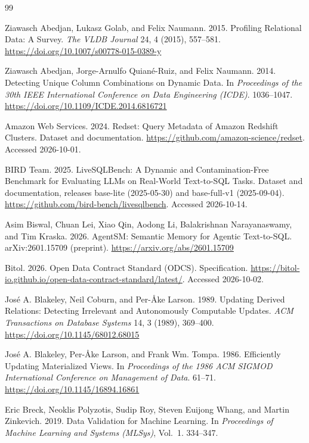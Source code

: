 \begin{thebibliography}{99}

Ziawasch Abedjan, Lukasz Golab, and Felix Naumann. 2015. Profiling Relational Data: A Survey. \emph{The VLDB Journal} 24, 4 (2015), 557--581. \url{https://doi.org/10.1007/s00778-015-0389-y}

Ziawasch Abedjan, Jorge-Arnulfo Quian{\'e}-Ruiz, and Felix Naumann. 2014. Detecting Unique Column Combinations on Dynamic Data. In \emph{Proceedings of the 30th IEEE International Conference on Data Engineering (ICDE)}. 1036--1047. \url{https://doi.org/10.1109/ICDE.2014.6816721}

Amazon Web Services. 2024. Redset: Query Metadata of Amazon Redshift Clusters. Dataset and documentation. \url{https://github.com/amazon-science/redset}. Accessed 2026-10-01.

BIRD Team. 2025. LiveSQLBench: A Dynamic and Contamination-Free Benchmark for Evaluating LLMs on Real-World Text-to-SQL Tasks. Dataset and documentation, releases base-lite (2025-05-30) and base-full-v1 (2025-09-04). \url{https://github.com/bird-bench/livesqlbench}. Accessed 2026-10-14.

Asim Biswal, Chuan Lei, Xiao Qin, Aodong Li, Balakrishnan Narayanaswamy, and Tim Kraska. 2026. AgentSM: Semantic Memory for Agentic Text-to-SQL. arXiv:2601.15709 (preprint). \url{https://arxiv.org/abs/2601.15709}

Bitol. 2026. Open Data Contract Standard (ODCS). Specification. \url{https://bitol-io.github.io/open-data-contract-standard/latest/}. Accessed 2026-10-02.

Jos{\'e} A. Blakeley, Neil Coburn, and Per-{\AA}ke Larson. 1989. Updating Derived Relations: Detecting Irrelevant and Autonomously Computable Updates. \emph{ACM Transactions on Database Systems} 14, 3 (1989), 369--400. \url{https://doi.org/10.1145/68012.68015}

Jos{\'e} A. Blakeley, Per-{\AA}ke Larson, and Frank Wm. Tompa. 1986. Efficiently Updating Materialized Views. In \emph{Proceedings of the 1986 ACM SIGMOD International Conference on Management of Data}. 61--71. \url{https://doi.org/10.1145/16894.16861}

Eric Breck, Neoklis Polyzotis, Sudip Roy, Steven Euijong Whang, and Martin Zinkevich. 2019. Data Validation for Machine Learning. In \emph{Proceedings of Machine Learning and Systems (MLSys)}, Vol.~1. 334--347.


\end{thebibliography}
